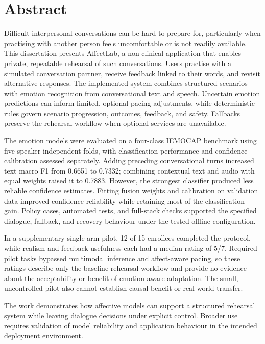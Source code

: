 \documentclass[12pt,a4paper,openany]{book}
\theoremstyle{definition}
\theoremstyle{remark}
\begin{document}
\newpage
\normalsize{}

\section*{Abstract} 
Difficult interpersonal conversations can be hard to prepare for, particularly when practising with another person feels uncomfortable or is not readily available. This dissertation presents AffectLab, a non-clinical application that enables private, repeatable rehearsal of such conversations. Users practise with a simulated conversation partner, receive feedback linked to their words, and revisit alternative responses. The implemented system combines structured scenarios with emotion recognition from conversational text and speech. Uncertain emotion predictions can inform limited, optional pacing adjustments, while deterministic rules govern scenario progression, outcomes, feedback, and safety. Fallbacks preserve the rehearsal workflow when optional services are unavailable.

The emotion models were evaluated on a four-class IEMOCAP benchmark using five speaker-independent folds, with classification performance and confidence calibration assessed separately. Adding preceding conversational turns increased text macro F1 from 0.6651 to 0.7332; combining contextual text and audio with equal weights raised it to 0.7883. However, the strongest classifier produced less reliable confidence estimates. Fitting fusion weights and calibration on validation data improved confidence reliability while retaining most of the classification gain. Policy cases, automated tests, and full-stack checks supported the specified dialogue, fallback, and recovery behaviour under the tested offline configuration.

In a supplementary single-arm pilot, 12 of 15 enrollees completed the protocol, while realism and feedback usefulness each had a median rating of 5/7. Required pilot tasks bypassed multimodal inference and affect-aware pacing, so these ratings describe only the baseline rehearsal workflow and provide no evidence about the acceptability or benefit of emotion-aware adaptation. The small, uncontrolled pilot also cannot establish causal benefit or real-world transfer.

The work demonstrates how affective models can support a structured rehearsal system while leaving dialogue decisions under explicit control. Broader use requires validation of model reliability and application behaviour in the intended deployment environment.
\end{document}
